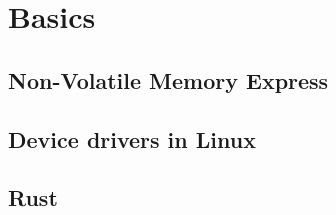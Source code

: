\chapter{Basics}

\section{Non-Volatile Memory Express}

\section{Device drivers in Linux}

\section{Rust}
